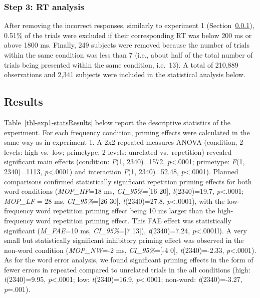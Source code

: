 \documentclass[
]{interact}
\begin{document}
\subsubsection{Step 3: RT analysis}\label{sec-exp1-analysis-RT}

After removing the incorrect responses, similarly to experiment 1
(Section~\ref{sec-exp1-analysis-RT}), 0.51\% of the trials were excluded
if their corresponding RT was below 200 ms or above 1800 ms. Finally,
249 subjects were removed because the number of trials within the same
condition was less than 7 (i.e., about half of the total number of
trials being presented within the same condition, i.e.~13). A total of
210,889 observations and 2,341 subjects were included in the statistical
analysis below.

\subsection{Results}\label{sec-exp1-results}

Table~\ref{tbl-exp1-statsResults} below report the descriptive
statistics of the experiment. For each frequency condition, priming
effects were calculated in the same way as in experiment 1. A 2x2
repeated-measures ANOVA (condition, 2 levels: high vs.~low; primetype, 2
levels: unrelated vs.~repetition) revealed significant main effects
(condition: \emph{F}(1, 2340)=1572, \emph{p}\textless.0001; primetype:
\emph{F}(1, 2340)=1113, \emph{p}\textless.0001) and interaction
\emph{F}(1, 2340)=52.48, \emph{p}\textless.0001). Planned comparisons
confirmed statistically significant repetition priming effects for both
word conditions (\emph{MOP\_HF}=18 ms, \emph{CI\_95\%}={[}16 20{]},
\emph{t}(2340)=19.7, \emph{p}\textless.0001; \emph{MOP\_LF} = 28 ms,
\emph{CI\_95\%}={[}26 30{]}, \emph{t}(2340)=27.8,
\emph{p}\textless.0001), with the low-frequency word repetition priming
effect being 10 ms larger than the high-frequency word repetition
priming effect. This FAE effect was statistically significant
(\emph{M\_FAE}=10 ms, \emph{CI\_95\%}={[}7 13{]}), \emph{t}(2340)=7.24,
\emph{p}\textless.0001l). A very small but statistically significant
inhibitory priming effect was observed in the non-word condition
(\emph{MOP\_NW}=-2 ms, \emph{CI\_95\%}={[}-4 0{]}, \emph{t}(2340)=-2.33,
\emph{p}\textless.0001). As for the word error analysis, we found
significant priming effects in the form of fewer errors in repeated
compared to unrelated trials in the all conditions (high:
\emph{t}(2340)=9.95, \emph{p}\textless.0001; low: \emph{t}(2340)=16.9,
\emph{p}\textless.0001; non-word: \emph{t}(2340)=-3.27, \emph{p}=.001).
\end{document}
